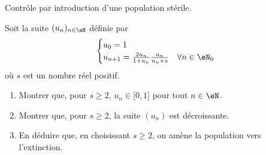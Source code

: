 
\begin{exercice}\label{exoTD3-0010}

	Contrôle par introduction d'une population stérile.

	Soit la suite $(u_n)_{n\in\eN}$ définie par
	\begin{equation}
		\begin{cases}
			u_0=1	&\\
			u_{n+1}=\frac{ 2u_n }{ 1+u_n }\frac{ u_n }{ u_n+s }	&	\forall n\in\eN_0
		\end{cases}
	\end{equation}
	où $s$ est un nombre réel positif.
	\begin{enumerate}
		\item
			Montrer que, pour $s\geq 2$, $u_n\in\mathopen[ 0 , 1 \mathclose]$ pour tout $n\in\eN$.
		\item
			Montrer que,  pour $s\geq 2$, la suite $(u_n)$ est décroissante.
		\item
			En déduire que, en choisissant $s\geq 2$, on amène la population vers l'extinction.

	\end{enumerate}

\end{exercice}
